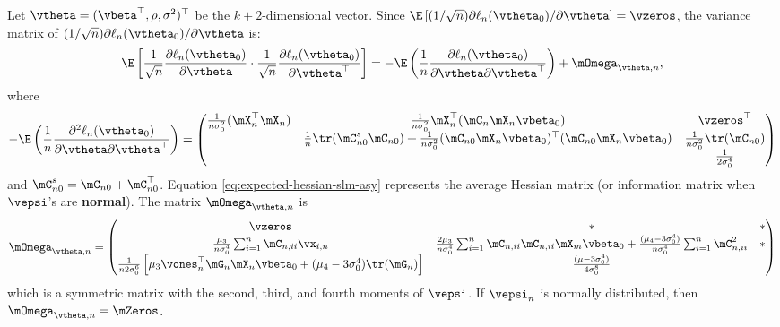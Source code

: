 \documentclass[english,12pt]{book}\usepackage[]{graphicx}\usepackage[]{xcolor}
\begin{document}
Let $\vtheta = (\vbeta^\top, \rho, \sigma^2)^\top$ be the $k+2$-dimensional vector. Since $\E\left[(1 / \sqrt{n}) \partial \ell_n (\vtheta_0)/\partial \vtheta\right]  = \vzeros$,  the variance matrix of $(1 / \sqrt{n}) \partial \ell_n(\vtheta_0) /\partial \vtheta$ is:
\begin{equation*}
  \E\left[\frac{1}{\sqrt{n}}\frac{\partial \ell_n (\vtheta_0)}{\partial \vtheta}\cdot\frac{1}{\sqrt{n}}\frac{\partial \ell_n (\vtheta_0)}{\partial \vtheta^\top} \right] = - \E\left(\frac{1}{n} \frac{\partial \ell_n(\vtheta_0)}{\partial \vtheta \partial \vtheta^\top}\right) + \mOmega_{\vtheta, n},
\end{equation*}
%
where 
\begin{equation}\label{eq:expected-hessian-slm-asy}
- \E\left(\frac{1}{n} \frac{\partial^2 \ell_n(\vtheta_0)}{\partial \vtheta \partial \vtheta^\top}\right)= 
	\begin{pmatrix}
	\frac{1}{n\sigma^2_0}(\mX_n^\top \mX_n)  & \frac{1}{n\sigma^2_0} \mX_n^\top (\mC_n\mX_n\vbeta_0) & \vzeros^\top \\
	   & \frac{1}{n}\tr(\mC^s_{n0}\mC_{n0}) + \frac{1}{n\sigma^2_0}(\mC_{n0}\mX_n\vbeta_0)^\top(\mC_{n0}\mX_n\vbeta_0) &  \frac{1}{n\sigma^2_0} \tr(\mC_{n0}) \\
		 &  & \frac{1}{2\sigma^4_0}
	\end{pmatrix} 
\end{equation}
%
and $\mC^s_{n0} = \mC_{n0} + \mC_{n0}^\top$. Equation \eqref{eq:expected-hessian-slm-asy} represents the average Hessian matrix (or information matrix when $\vepsi$'s are \textbf{normal}). The matrix $ \mOmega_{\vtheta, n}$ is 
\begin{equation}\label{eq:Omega-slm-ml}
\mOmega_{\vtheta, n}  = \begin{pmatrix} 
                            \vzeros & * & * \\
                            \frac{\mu_{3}}{n\sigma_0^4}\sum_{i = 1}^n\mC_{n, ii}\vx_{i, n} & \frac{2\mu_3}{n\sigma_0^4}\sum_{i = 1}^n\mC_{n, ii}\mC_{n, ii}\mX_m\vbeta_0 + \frac{(\mu_4 - 3\sigma_0^4)}{n\sigma_0^4}\sum_{i = 1}^n\mC_{n, ii}^2 & * \\
                            \frac{1}{n2\sigma_0^6}\left[\mu_3\vones_n^\top\mG_n\mX_n\vbeta_0 + (\mu_4 -3\sigma_0^4)\tr(\mG_n)\right] & \frac{(\mu - 3\sigma_0^4)}{4\sigma_0^8}
                         \end{pmatrix}
\end{equation}
%
which is a symmetric matrix with the second, third, and fourth moments of $\vepsi$. If $\vepsi_n$ is normally distributed, then $\mOmega_{\vtheta, n} = \mZeros$. 
\end{document}
